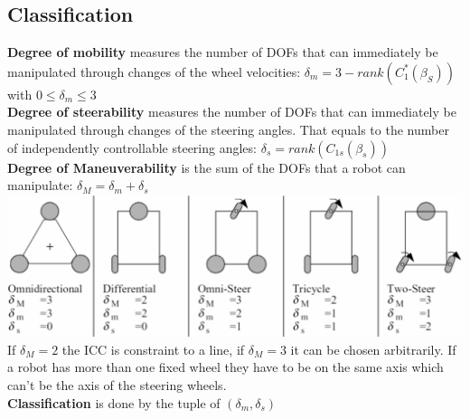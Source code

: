 \documentclass[12pt]{article}
\begin{document}
	\subsection{Classification}
	\textbf{Degree of mobility} measures the number of DOFs that can immediately be manipulated through changes of the wheel velocities: $\delta_m = 3 - rank(C_1^*(\beta_S))$ with $0 \leq \delta_m \leq 3$\\
	\textbf{Degree of steerability} measures the number of DOFs that can immediately be manipulated through changes of the steering angles. That equals to the number of independently controllable steering angles: $\delta_s = rank(C_{1s}(\beta_s))$\\
	\textbf{Degree of Maneuverability} is the sum of the DOFs that a robot can manipulate: $\delta_M = \delta_m + \delta_s$\\
	\includegraphics[width=\linewidth]{figures/robots-dofs.png}\\
	If $\delta_M = 2$ the ICC is constraint to a line, if $\delta_M = 3$ it can be chosen arbitrarily. If a robot has more than one fixed wheel they have to be on the same axis which can't be the axis of the steering wheels.\\
	\textbf{Classification} is done by the tuple of $(\delta_m, \delta_s)$
	
\end{document}
